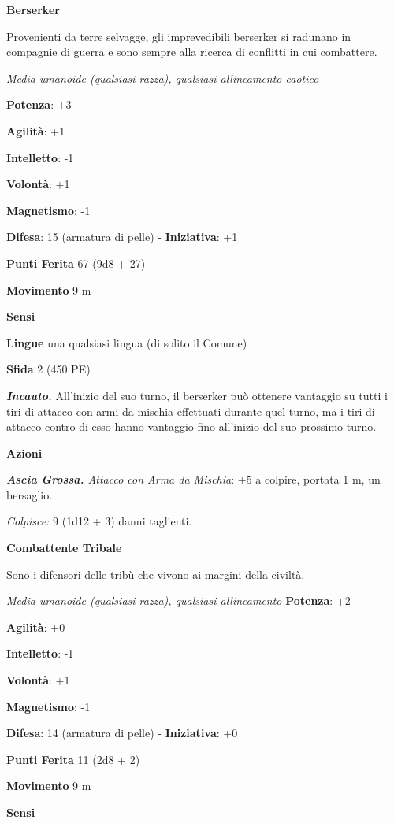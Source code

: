 \begin{multicols}{2}
\textbf{Berserker}

Provenienti da terre selvagge, gli imprevedibili berserker si radunano
in compagnie di guerra e sono sempre alla ricerca di conflitti in cui
combattere.

\emph{Media umanoide (qualsiasi razza), qualsiasi allineamento caotico}

\textbf{Potenza}: +3

\textbf{Agilità}: +1

\textbf{Intelletto}: -1

\textbf{Volontà}: +1

\textbf{Magnetismo}: -1

\textbf{Difesa}: 15 (armatura di pelle) - \textbf{Iniziativa}: +1

\textbf{Punti Ferita} 67 (9d8 + 27)

\textbf{Movimento} 9 m

\textbf{Sensi} 

\textbf{Lingue} una qualsiasi lingua (di solito il Comune)

\textbf{Sfida} 2 (450 PE)\smallskip

\emph{\textbf{Incauto.}} All'inizio del suo turno, il berserker può
ottenere vantaggio su tutti i tiri di attacco con armi da mischia
effettuati durante quel turno, ma i tiri di attacco contro di esso hanno
vantaggio fino all'inizio del suo prossimo turno.

\smallskip\textbf{Azioni}

\emph{\textbf{Ascia Grossa.} Attacco con Arma da Mischia}: +5 a colpire,
portata 1 m, un bersaglio.

\emph{Colpisce:} 9 (1d12 + 3) danni taglienti.

\textbf{Combattente Tribale}

Sono i difensori delle tribù che vivono ai margini della civiltà.

\emph{Media umanoide (qualsiasi razza), qualsiasi allineamento}
\textbf{Potenza}: +2

\textbf{Agilità}: +0

\textbf{Intelletto}: -1

\textbf{Volontà}: +1

\textbf{Magnetismo}: -1

\textbf{Difesa}: 14 (armatura di pelle) - \textbf{Iniziativa}: +0

\textbf{Punti Ferita} 11 (2d8 + 2)

\textbf{Movimento} 9 m

\textbf{Sensi} 


\end{multicols}
